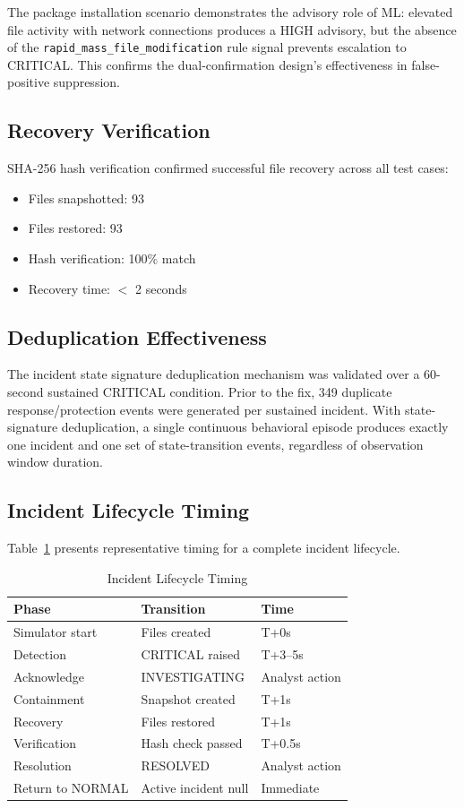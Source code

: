 \documentclass[conference]{IEEEtran}
\begin{document}
The package installation scenario demonstrates the advisory
role of ML: elevated file activity with network connections
produces a HIGH advisory, but the absence of the
\texttt{rapid\_mass\_file\_modification} rule signal prevents
escalation to CRITICAL. This confirms the dual-confirmation
design's effectiveness in false-positive suppression.

\subsection{Recovery Verification}

SHA-256 hash verification confirmed successful file recovery
across all test cases:

\begin{itemize}
    \item Files snapshotted: 93
    \item Files restored: 93
    \item Hash verification: 100\% match
    \item Recovery time: $<$ 2 seconds
\end{itemize}

\subsection{Deduplication Effectiveness}

The incident state signature deduplication mechanism was
validated over a 60-second sustained CRITICAL condition.
Prior to the fix, 349 duplicate response/protection events
were generated per sustained incident. With state-signature
deduplication, a single continuous behavioral episode
produces exactly one incident and one set of state-transition
events, regardless of observation window duration.

\subsection{Incident Lifecycle Timing}

Table~\ref{tab:timing} presents representative timing for
a complete incident lifecycle.

\begin{table}[htbp]
\caption{Incident Lifecycle Timing}
\label{tab:timing}
\centering
\begin{tabular}{@{}lll@{}}
\toprule
\textbf{Phase} & \textbf{Transition} & \textbf{Time} \\
\midrule
Simulator start & Files created & T+0s \\
Detection & CRITICAL raised & T+3--5s \\
Acknowledge & INVESTIGATING & Analyst action \\
Containment & Snapshot created & T+1s \\
Recovery & Files restored & T+1s \\
Verification & Hash check passed & T+0.5s \\
Resolution & RESOLVED & Analyst action \\
Return to NORMAL & Active incident null & Immediate \\
\bottomrule
\end{tabular}
\end{table}
\end{document}
